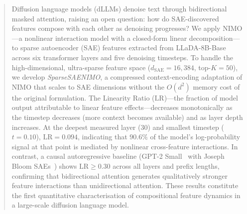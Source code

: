 \documentclass{article}
\newcommand{\LR}{\mathrm{LR}}
\begin{document}

\printAffiliationsAndNotice{}

\begin{abstract}
Diffusion language models (dLLMs) denoise text through bidirectional masked attention, raising an open question: how do SAE-discovered features compose with each other as denoising progresses?
We apply NIMO---a nonlinear interaction model with a closed-form linear decomposition---to sparse autoencoder (SAE) features extracted from LLaDA-8B-Base~\citep{llada2025} across six transformer layers and five denoising timesteps.
To handle the high-dimensional, ultra-sparse feature space ($d_\mathrm{SAE} = 16{,}384$, top-$K = 50$), we develop \emph{SparseSAENIMO}, a compressed context-encoding adaptation of NIMO that scales to SAE dimensions without the $O(d^2)$ memory cost of the original formulation.
The Linearity Ratio ($\LR$)---the fraction of model output attributable to linear feature effects---decreases monotonically as the timestep decreases (more context becomes available) and as layer depth increases.
At the deepest measured layer (30) and smallest timestep ($t = 0.10$), $\LR = 0.094$, indicating that $90.6\%$ of the model's log-probability signal at that point is mediated by nonlinear cross-feature interactions.
In contrast, a causal autoregressive baseline (GPT-2 Small~\citep{radford2019language} with Joseph Bloom SAEs~\citep{bloom2024sae}) shows $\LR \ge 0.30$ across all layers and prefix lengths, confirming that bidirectional attention generates qualitatively stronger feature interactions than unidirectional attention.
These results constitute the first quantitative characterisation of compositional feature dynamics in a large-scale diffusion language model.
\end{abstract}

\end{document}
